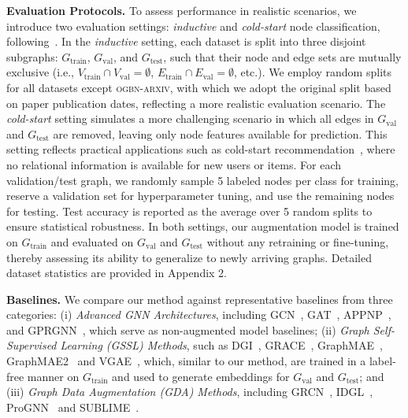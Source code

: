 \documentclass[letterpaper]{article} \usepackage{aaai2026}  \usepackage{times}  \usepackage{helvet}  \usepackage{courier}  \usepackage[hyphens]{url}  \usepackage{graphicx} \urlstyle{rm} \def\UrlFont{\rm}  \usepackage{natbib}  \usepackage{caption} \frenchspacing  \setlength{\pdfpagewidth}{8.5in}  \setlength{\pdfpageheight}{11in}
\begin{document}
\noindent\textbf{Evaluation Protocols.} To assess performance in realistic scenarios, we introduce two evaluation settings: \textit{inductive} and \textit{cold-start} node classification, following~\cite{li2023gslb}. In the \textit{inductive}  setting, each dataset is split into three disjoint subgraphs: \( G_{\text{train}} \), \( G_{\text{val}} \), and \( G_{\text{test}} \), such that their node and edge sets are mutually exclusive (i.e., \( V_{\text{train}} \cap V_{\text{val}} = \emptyset \), \( E_{\text{train}} \cap E_{\text{val}} = \emptyset \), etc.). We employ random splits for all datasets except \textsc{ogbn-arxiv}, with which we adopt the original split based on paper publication dates, reflecting a more realistic evaluation scenario.
The \textit{cold-start} setting simulates a more challenging scenario in which all edges in \( G_{\text{val}} \) and \( G_{\text{test}} \) are removed, leaving only node features available for prediction. This setting reflects practical applications such as cold-start recommendation~\cite{chen2020esam}, where no relational information is available for new users or items.
For each validation/test graph, we randomly sample 5 labeled nodes per class for training, reserve a validation set for hyperparameter tuning, and use the remaining nodes for testing. Test accuracy is reported as the average over 5 random splits to ensure statistical robustness.
In both settings, our augmentation model is trained on \( G_{\text{train}} \) and evaluated on \( G_{\text{val}} \) and \( G_{\text{test}} \) without any retraining or fine-tuning, thereby assessing its ability to generalize to newly arriving graphs.
Detailed dataset statistics are provided in Appendix 2.

\noindent\textbf{Baselines.} We compare our method against representative baselines from three categories: (i) \textit{Advanced GNN Architectures}, including GCN~\cite{kipf2016semi}, GAT~\cite{velivckovic2017graph}, APPNP~\cite{gasteiger2018predict}, and GPRGNN~\cite{chien2020adaptive}, which serve as non-augmented model baselines; (ii) \textit{Graph Self-Supervised Learning (GSSL) Methods}, such as DGI~\cite{velivckovic2018deep}, GRACE~\cite{zhu2020deep}, GraphMAE~\cite{hou2022graphmae}, GraphMAE2~\cite{hou2023graphmae2} and VGAE~\cite{kipf2016variational}, which, similar to our method, are trained in a label-free manner on \( G_{\text{train}} \) and used to generate embeddings for \( G_{\text{val}} \) and \( G_{\text{test}} \); and (iii) \textit{Graph Data Augmentation (GDA) Methods}, including GRCN~\cite{yu2021graph}, IDGL~\cite{chen2020iterative}, ProGNN~\cite{jin2020graph} and SUBLIME~\cite{liu2022towards}.
\end{document}

